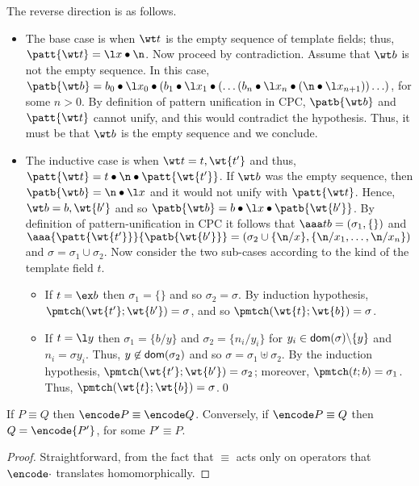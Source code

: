 \documentclass{LMCS}
\begin{document}
The reverse direction is as follows.
\begin{itemize}
	\item The base case is when $\wt t$ is the empty sequence of template fields;
				thus, $\patt{\wt t} = \l x \bullet \n$.
				Now proceed by contradiction.
				Assume that $\wt b$ is not the empty sequence.
				In this case, $\patb{\wt b} = b_0 \bullet\l x_0\bullet(b_1 \bullet\l x_1\bullet(
				\ldots(b_n \bullet\l x_n \bullet (\n \bullet \l x_{n+1}))\ldots)$,
				for some $n > 0$.
				By definition of pattern unification in CPC, $\patb{\wt b}$ and $\patt{\wt t}$ cannot unify,
				and this would contradict the hypothesis. Thus, it must be that $\wt b$ is the empty sequence
				and we conclude.
	\item The inductive case is when $\wt t = t, \wt{t'}$ and thus,
				$\patt{\wt t} = t \bullet \n \bullet \patt{\wt{t'}}$.
				If $\wt b$ was the empty sequence, then
				$\patb{\wt b} = \n \bullet \l x$ and it would not unify with $\patt{\wt t}$.
 				Hence, $\wt b = b, \wt{b'}$ and so
 				$\patb{\wt b} = b \bullet \l x \bullet \patb{\wt{b'}}$.
 				By definition of pattern-unification in CPC it follows that
 				$\aaa t b = (\sigma_1, \{\})$ and
				$\aaa {\patt{\wt {t'}}} {\patb{\wt {b'}}} =(\sigma_2 \cup \{\n/x\},
				\{\n/x_1,\ldots, \n/x_n\})$	and $\sigma=\sigma_1\cup\sigma_2$.
				Now consider the two sub-cases according to the kind of the template field $t$.
				\begin{itemize}
					\item If $t = \ex b$ then $\sigma_1 = \{\}$ and so $\sigma_2 = \sigma$.
								By induction hypothesis, $\pmtch(\wt{t'};\wt{b'}) = \sigma$,
								and so $\pmtch(\wt{t};\wt{b}) = \sigma$.
					\item If $t = \l y$ then $\sigma_1 = \{b/y\}$ and
								$\sigma_2=\{n_i/y_i\}$ for $y_i\in{\sf dom}(\sigma)\backslash \{y\}$
								and $n_i=\sigma y_i$.
								Thus, $y \not\in {\sf dom}(\sigma_2)$ and so $\sigma = \sigma_1 \uplus \sigma_2$.
								By the induction hypothesis, $\pmtch(\wt{t'};\wt{b'}) = \sigma_2$;
								moreover, $\pmtch(t;b) = \sigma_1$.
								Thus, $\pmtch(\wt{t};\wt{b}) = \sigma$.\qed
				\end{itemize}
\end{itemize}



\begin{lem}
\label{lem:structenc-linda}
If $P \equiv Q$ then $\encode P \equiv \encode Q$.
Conversely, if $\encode P \equiv Q$ then $Q = \encode{P'}$, for some $P' \equiv P$.
\end{lem}
\begin{proof}
Straightforward, from the fact that $\equiv$ acts only on operators that $\encode\cdot$ translates homomorphically.
\end{proof}
\end{document}
